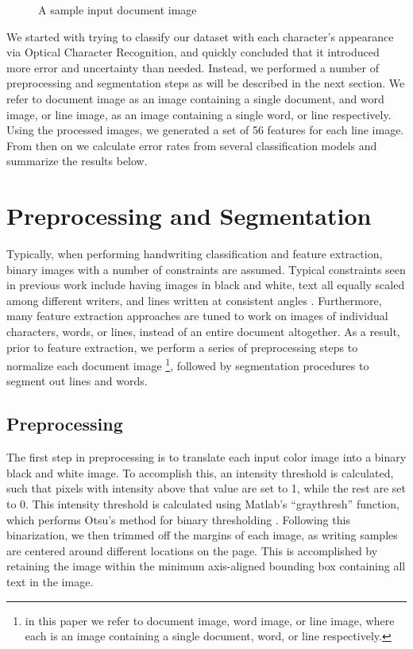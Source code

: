 \documentclass[paper=a4, fontsize=11pt]{scrartcl} %
\numberwithin{equation}{section} %
\numberwithin{figure}{section} %
\numberwithin{table}{section} %
\begin{document}
\begin{figure}
\caption{A sample input document image}
\label{fig:docImage}
\end{figure}

We started with trying to classify our dataset with each character’s appearance via Optical Character Recognition, and quickly concluded that it introduced more error and uncertainty than needed. Instead, we performed a number of preprocessing and segmentation steps as will be described in the next section. We refer to document image as an image containing a single document,  and word image, or line image, as an image containing a single word, or line respectively. Using the processed images, we generated a set of 56 features for each line image. From then on we calculate error rates from several classification models and summarize the results below.

\section{Preprocessing and Segmentation}
\label{sec:pands}
Typically, when performing handwriting classification and feature extraction, binary images with a number of constraints are assumed. Typical constraints seen in previous work include having images in black and white, text all equally scaled among different writers, and lines written at consistent angles \cite{Preprocessing}. Furthermore, many feature extraction approaches are tuned to work on images of individual characters, words, or lines, instead of an entire document altogether. As a result, prior to feature extraction, we perform a series of preprocessing steps to normalize each document image \footnote{in this paper we refer to
document image, word image, or line image, where each is an image
containing a single document, word, or line respectively.}, followed by segmentation procedures to segment out lines and words.

\subsection{Preprocessing}
The first step in preprocessing is to translate each input color image
into a binary black and white image. To accomplish this, an intensity
threshold is calculated, such that pixels with intensity above that
value are set to 1, while the rest are set to 0. This intensity
threshold is calculated using Matlab's ``graythresh'' function, which
performs Otsu's method for binary thresholding
\cite{ThresholdSelection}. Following this binarization, we then trimmed
off the margins of each image, as writing samples are centered around
different locations on the page. This is accomplished by retaining the
image within the minimum axis-aligned bounding box containing all text
in the image.
\end{document}
